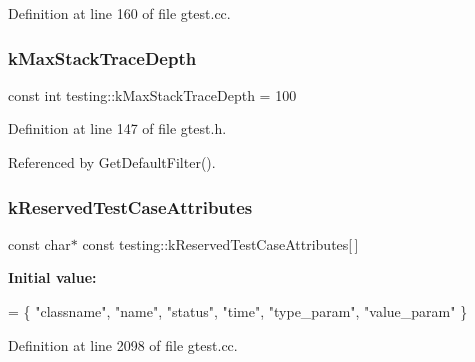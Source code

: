 Definition at line 160 of file gtest.\+cc.

\mbox{\label{namespacetesting_ae605f2ccac04616bb7812ca72e517082}} 
\subsubsection{\texorpdfstring{k\+Max\+Stack\+Trace\+Depth}{kMaxStackTraceDepth}}
{\footnotesize\ttfamily const int testing\+::k\+Max\+Stack\+Trace\+Depth = 100}



Definition at line 147 of file gtest.\+h.



Referenced by Get\+Default\+Filter().

\mbox{\label{namespacetesting_ae9689f28cd859736f734623b26c93d88}} 
\subsubsection{\texorpdfstring{k\+Reserved\+Test\+Case\+Attributes}{kReservedTestCaseAttributes}}
{\footnotesize\ttfamily const char$\ast$ const testing\+::k\+Reserved\+Test\+Case\+Attributes\mbox{[}$\,$\mbox{]}\hspace{0.3cm}{\ttfamily [static]}}

{\bfseries Initial value\+:}
\begin{DoxyCode}
= \{
  \textcolor{stringliteral}{"classname"},
  \textcolor{stringliteral}{"name"},
  \textcolor{stringliteral}{"status"},
  \textcolor{stringliteral}{"time"},
  \textcolor{stringliteral}{"type\_param"},
  \textcolor{stringliteral}{"value\_param"}
\}
\end{DoxyCode}


Definition at line 2098 of file gtest.\+cc.

\mbox{\label{namespacetesting_af44b2969928d37e9081145760f21e79a}} 
